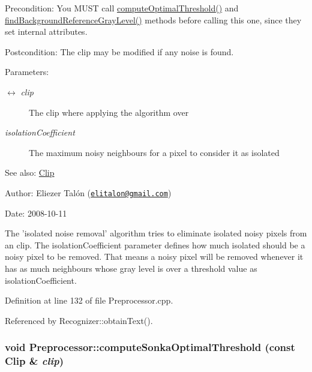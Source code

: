 \begin{Desc}
\item[Precondition:]You MUST call \hyperlink{class_preprocessor_aaeb94a3b52b835bc26efebb40be25bc}{computeOptimalThreshold()} and \hyperlink{class_preprocessor_a941f81382bd8e235e4dd12481342be4}{findBackgroundReferenceGrayLevel()} methods before calling this one, since they set internal attributes. \end{Desc}
\begin{Desc}
\item[Postcondition:]The clip may be modified if any noise is found.\end{Desc}
\begin{Desc}
\item[Parameters:]
\begin{description}
\item[\mbox{$\leftrightarrow$} {\em clip}]The clip where applying the algorithm over \item[{\em isolationCoefficient}]The maximum noisy neighbours for a pixel to consider it as isolated\end{description}
\end{Desc}
\begin{Desc}
\item[See also:]\hyperlink{class_clip}{Clip}\end{Desc}
\begin{Desc}
\item[Author:]Eliezer Talón (\href{mailto:elitalon@gmail.com}{\tt elitalon@gmail.com}) \end{Desc}
\begin{Desc}
\item[Date:]2008-10-11\end{Desc}
The 'isolated noise removal' algorithm tries to eliminate isolated noisy pixels from an clip. The isolationCoefficient parameter defines how much isolated should be a noisy pixel to be removed. That means a noisy pixel will be removed whenever it has as much neighbours whose gray level is over a threshold value as isolationCoefficient. 

Definition at line 132 of file Preprocessor.cpp.

Referenced by Recognizer::obtainText().\hypertarget{class_preprocessor_3d4fa7e4721c62997beb93a41d729c99}{
\subsubsection[computeSonkaOptimalThreshold]{\setlength{\rightskip}{0pt plus 5cm}void Preprocessor::computeSonkaOptimalThreshold (const {\bf Clip} \& {\em clip})}}
\label{class_preprocessor_3d4fa7e4721c62997beb93a41d729c99}



